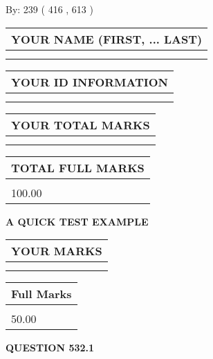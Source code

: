 \documentclass[12pt]{article}
\begin{document}
   
\hspace{1.0in} By: 
 239 ( 416 ,  613 )
   
   
   
   
\newpage 
\setcounter{page}{ 
   532001 } 
   
   
   
   
\noindent\begin{tabular}{|l|}
\hline
YOUR NAME (FIRST, ... LAST)  \\
\hline
 \\ 
 \\ 
\hline
\end{tabular}
\hspace{0.05in} \begin{tabular}{|l|}
\hline
 YOUR   ID   INFORMATION  \\
\hline
 \\ 
 \\ 
\hline
\end{tabular}
   
   
\vspace{0.2in}\noindent\begin{tabular}{|l|}
\hline
YOUR TOTAL MARKS  \\
\hline
 \\ 
 \\ 
\hline
\end{tabular}
\hspace{0.05in} \begin{tabular}{|l|}
\hline
TOTAL FULL MARKS  \\
\hline
 \\ 
100.00 \\
\hline
\end{tabular}
   
   
 \vspace{0.2in}
{\LARGE {\textbf{ A QUICK TEST EXAMPLE}}}
   
   
  
\vspace{0.2in}
  
\noindent\begin{tabular}{|l|}
\hline
 YOUR MARKS  \\
\hline
 \\ 
 \\ 
\hline
\end{tabular}
\hspace{0.05in} \begin{tabular}{|l|}
\hline
 Full Marks  \\
\hline
 \\ 
50.00 \\
\hline
\end{tabular}
{\textbf{\Large{QUESTION
532.1 
}}}
  
\end{document}
